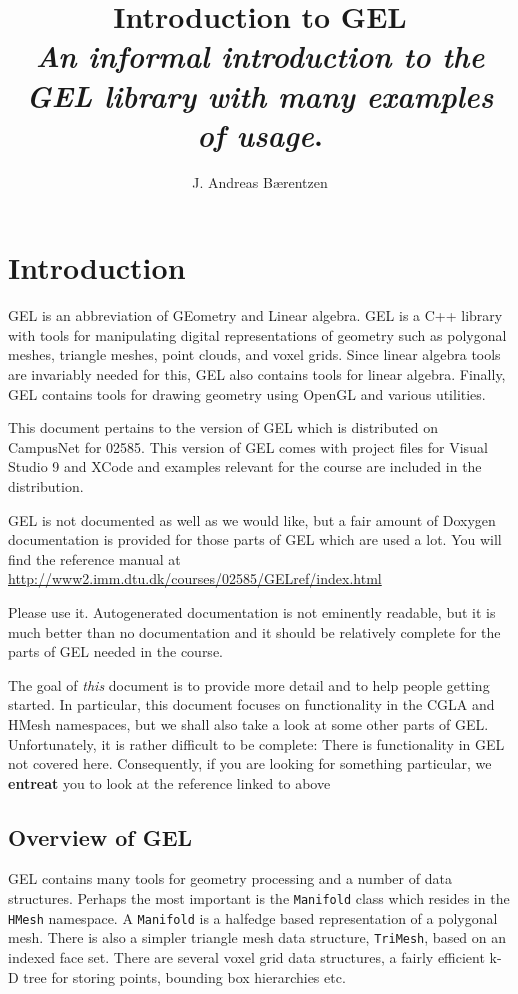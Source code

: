 \documentclass[a4paper]{article}
\author{J. Andreas B{\ae}rentzen}
\title{Introduction to GEL\\\vspace{0.25cm} \normalsize
\textit{An informal introduction to the GEL library with many examples of usage}.}
\begin{document}
\maketitle
\tableofcontents
\newpage\section{Introduction}
\sloppy

GEL is an abbreviation of GEometry and Linear algebra. GEL is a C++ library with tools for manipulating digital representations of geometry such as polygonal meshes, triangle meshes, point clouds, and voxel grids. Since linear algebra tools are invariably needed for this, GEL also contains tools for linear algebra. Finally, GEL contains tools for drawing geometry using OpenGL and various utilities.

This document pertains to the version of GEL which is distributed on CampusNet for 02585. This version of GEL comes with project files for Visual Studio 9 and XCode and examples relevant for the course are included in the distribution.

GEL is not documented as well as we would like, but a fair amount of Doxygen documentation is provided for those parts of GEL which are used a lot. You will find the reference manual at \href{http://www2.imm.dtu.dk/courses/02585/GELref/index.html}{http://www2.imm.dtu.dk/courses/02585/GELref/index.html}

Please use it. Autogenerated documentation is not eminently readable, but it is much better than no documentation and it should be relatively complete for the parts of GEL needed in the course. 

The goal of \textit{this} document is to provide more detail and to help people getting started. In particular, this document focuses on functionality in the CGLA and HMesh namespaces, but we shall also take a look at some other parts of GEL. Unfortunately, it is rather difficult to be complete: There is functionality in GEL not covered here. Consequently, if you are looking for something particular, we \textbf{entreat } you to look at the reference linked to above
\subsection{Overview of GEL}

GEL contains many tools for geometry processing and a number of data structures. Perhaps the most important is the \texttt{Manifold} class which resides in the \texttt{HMesh} namespace. A \texttt{Manifold} is a halfedge based representation of a polygonal mesh. There is also a simpler triangle mesh data structure, \texttt{TriMesh}, based on an indexed face set. There are several voxel grid data structures, a fairly efficient k-D tree for storing points, bounding box hierarchies etc.
\end{document}
